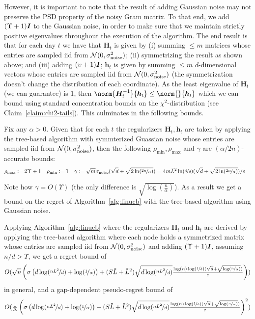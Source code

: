 \documentclass{article}
\renewcommand{\vec}[1]{\bm{#1}}
\newcommand{\defeq}{\coloneq}
\newcommand{\inv}[1]{#1^{-1}}
\newcommand{\Normal}{\mathcal{N}}
\newcommand{\Eye}[1][]{\bm{I}\notblank{#1}{_{{#1}\times{#1}}}{}}
\begin{document}
However, it is important to note that the result of adding Gaussian
noise may not preserve the PSD property of the noisy Gram matrix. To
that end, we add $(\Upsilon +1)\Eye$ to the Gaussian noise, in order
to make sure that we maintain strictly positive eigenvalues throughout
the execution of the algorithm. The end result is that for each day
$t$ we have that $\vec H_t$ is given by (i) summing $\leq m$ matrices
whose entries are sampled iid from $\Normal(0,\sigma_{\rm noise}^2)$;
(ii) symmetrizing the result as shown above; and (iii) adding
$(\upsilon+1)\Eye$; $\vec h_t$ is given by summing $\leq m$
$d$-dimensional vectors whose entries are sampled iid from
$\Normal(0,\sigma_{\rm noise}^2)$ (the symmetrization doesn't change
the distribution of each coordinate). As the least eigenvalue of
$\vec H_t$ (we can guarantee) is $1$, then
$\norm{\inv{\vec H_t}}{\vec h_t} \leq \norm{}{\vec h_t}$ which we can
bound using standard concentration bounds on the $\chi^2$-distribution
(see Claim~\ref{claim:chi2-tails}). This culminates in the following
bounds.
\begin{proposition}
\label{pro:accurate_bounds_for_Gaussian}
Fix any $\alpha>0$. Given that for each $t$ the regularizers $\vec H_t, \vec h_t$ are taken by applying the tree-based algorithm with symmterized Guassian noise whose entries are sampled iid from $\Normal(0, \sigma_{\rm noise}^2)$, then the following $\rho_{\min},\rho_{\max}$ and $\gamma$ are $(\alpha/2n)$-accurate bounds:
\begin{align*}
    &\rho_{\max}\defeq  2\Upsilon+1 &&\rho_{\min}\defeq 1 && \gamma \defeq \sqrt m\sigma_{\rm noise}(\sqrt d + \sqrt{2\ln(\nicefrac{2n}\alpha)})=4m\tilde L^2 \ln(\nicefrac 4 \delta) (\sqrt d + \sqrt{2\ln(\nicefrac{2n}\alpha)})/\varepsilon
  \end{align*}
\end{proposition}
Note how $\gamma=O(\Upsilon)$ (the only difference is $\sqrt{\log(\tfrac n \alpha)}$).
As a result we get a bound on the regret of Algorithm~\ref{alg:linucb} with the tree-based algorithm using Gaussian noise.
\begin{corollary}
\label{cor:regret_with_Gaussian}
Applying Algorithm~\ref{alg:linucb} where the regularizers $\vec H_t$ and $\vec h_t$ are derived by applying the tree-based algorithm where each node holds a symmetrized matrix whose entries are sampled iid from $\Normal(0,\sigma_{\rm noise}^2)$ and adding $(\Upsilon+1)\Eye$, assuming $n/d>\Upsilon$, we get a regret bound of
\[O(\sqrt n \left(  \sigma\left(d\log(\nicefrac{nL^2}{d}) + \log(\nicefrac 1 \alpha) \right) + (S\tilde{L}+\tilde{L}^2)\sqrt{d\log(\nicefrac{nL^2}{d})}\tfrac{\log(n)\log(\nicefrac 1 \delta)(\sqrt d + \sqrt{\log(\nicefrac n \alpha)})}{\varepsilon}\right) )\]
in general, and a gap-dependent pseudo-regret bound of
\[O(\tfrac 1 \Delta \left(  \sigma\left(d\log(\nicefrac{nL^2}{d}) + \log(\nicefrac 1 \alpha) \right) + (S\tilde{L}+\tilde{L}^2)\sqrt{d\log(\nicefrac{nL^2}{d})}\tfrac{\log(n)\log(\nicefrac 1 \delta)(\sqrt d + \sqrt{\log(\nicefrac n \alpha)})}{\varepsilon}\right)^2 )\]
\end{corollary}
\end{document}
